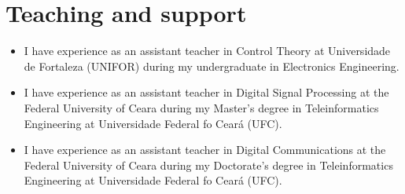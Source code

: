 \section{Teaching and support}
\begin{itemize}[leftmargin=0.15in, label={}] %
    \item I have experience as an assistant teacher in Control Theory at Universidade de Fortaleza (UNIFOR) during my undergraduate in Electronics Engineering.
    \item I have experience as an assistant teacher in Digital Signal Processing at the Federal University of Ceara during my Master's degree in Teleinformatics Engineering at Universidade Federal fo Cear\'{a} (UFC). 
    \item I have experience as an assistant teacher in Digital Communications at the Federal University of Ceara during my Doctorate's degree in Teleinformatics Engineering at Universidade Federal fo Cear\'{a} (UFC). 
\end{itemize}
